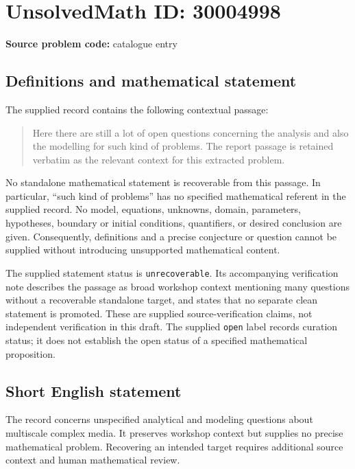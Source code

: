 \documentclass[11pt]{article}
\begin{document}
\section*{UnsolvedMath ID: 30004998}
\textbf{Source problem code:} catalogue entry
\subsection{Definitions and mathematical statement}
The supplied record contains the following contextual passage:
\begin{quote}
Here there are still a lot of open questions concerning the analysis and also the modelling for such kind of problems. The report passage is retained verbatim as the relevant context for this extracted problem.
\end{quote}
No standalone mathematical statement is recoverable from this passage. In particular, ``such kind of problems'' has no specified mathematical referent in the supplied record. No model, equations, unknowns, domain, parameters, hypotheses, boundary or initial conditions, quantifiers, or desired conclusion are given. Consequently, definitions and a precise conjecture or question cannot be supplied without introducing unsupported mathematical content.

The supplied statement status is \texttt{unrecoverable}. Its accompanying verification note describes the passage as broad workshop context mentioning many questions without a recoverable standalone target, and states that no separate clean statement is promoted. These are supplied source-verification claims, not independent verification in this draft. The supplied \texttt{open} label records curation status; it does not establish the open status of a specified mathematical proposition.
\subsection{Short English statement}
The record concerns unspecified analytical and modeling questions about multiscale complex media. It preserves workshop context but supplies no precise mathematical problem. Recovering an intended target requires additional source context and human mathematical review.
\end{document}
